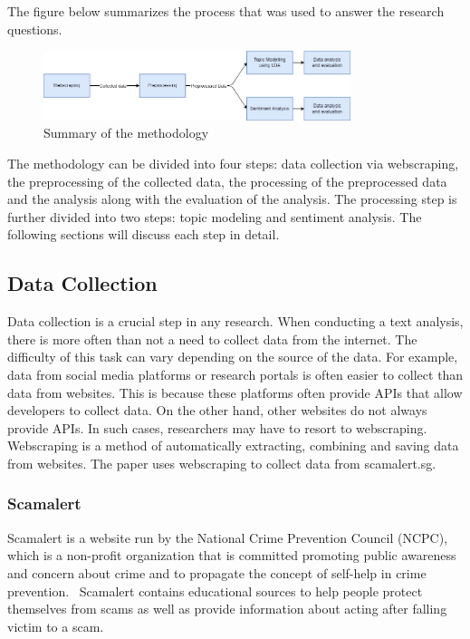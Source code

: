 \documentclass[12pt,english,titlepage,a4paper]{article}
\begin{document}
The figure below summarizes the process that was used to answer the research questions.

\begin{figure}[h]
    \centering
    \includegraphics[width=0.8\textwidth]{resources/methodology.png}
    \caption{Summary of the methodology}
    \label{fig:methodology}
\end{figure}

The methodology can be divided into four steps: data collection via webscraping, the preprocessing of the collected data, the processing of the preprocessed data and the analysis along with the evaluation of the analysis. The processing step is further divided into two steps: topic modeling and sentiment analysis. The following sections will discuss each step in detail. 

\subsection{Data Collection}

Data collection is a crucial step in any research. When conducting a text analysis, there is more often than not a need to collect data from the internet. The difficulty of this task can vary depending on the source of the data. For example, data from social media platforms or research portals is often easier to collect than data from websites. This is because these platforms often provide APIs that allow developers to collect data. On the other hand, other websites do not always provide APIs. In such cases, researchers may have to resort to webscraping. Webscraping is a method of automatically extracting, combining and saving data from websites. The paper uses webscraping to collect data from scamalert.sg.

\subsubsection{Scamalert}

Scamalert is a website run by the National Crime Prevention Council (NCPC), which is a non-profit organization that is committed promoting public awareness and concern about crime and to propagate the concept of self-help in crime prevention.~\citep{ncpc} Scamalert contains educational sources to help people protect themselves from scams as well as provide information about acting after falling victim to a scam.
\end{document}
